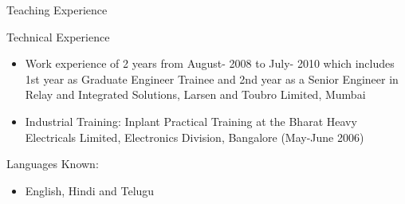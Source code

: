 \documentclass[10pt]{article}
\begin{document}
\begin{cv}
\begin{cvlist}{Teaching Experience}
\end{cvlist}
\begin{cvlist}{Technical Experience}
\item
\begin{itemize}\itemsep=0.25em
	\item Work experience of 2 years from August- 2008 to July- 2010 which includes 1st year as
Graduate Engineer Trainee and 2nd year as a Senior Engineer in Relay and Integrated
Solutions, Larsen and Toubro Limited, Mumbai
%




\item
Industrial Training:
Inplant Practical Training at the Bharat Heavy
Electricals Limited, Electronics Division, Bangalore
(May-June 2006)


	
\end{itemize}
\end{cvlist}



\begin{cvlist}{Languages Known:}
\item
\begin{itemize}\itemsep=0.25em
	\item English, Hindi and Telugu
	\end{itemize}

\end{cvlist}




\setlength{\cvlabelwidth}{\oldcvlabelwidth}
\setlength{\cvlabelsep}{\oldcvlabelsep}

\end{cv}
\end{document}
